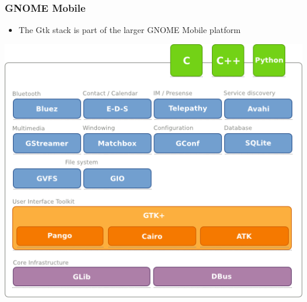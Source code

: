 \begin{frame}
  \frametitle{GNOME Mobile}
  \begin{itemize}
  \item The Gtk stack is part of the larger GNOME Mobile platform
  \end{itemize}
  \begin{center}
    \includegraphics[height=0.7\textheight]{slides/sysdev-embedded-linux/gnome-mobile.png}
  \end{center}
\end{frame}

